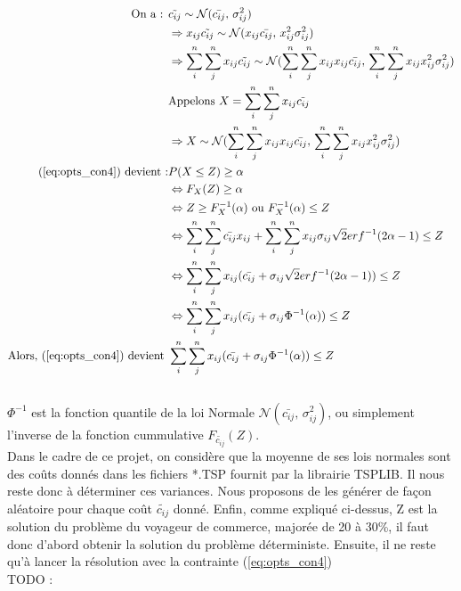 \documentclass{article}
\begin{document}
\begin{equation}
\begin{aligned}
\textrm{On a : } 
& \tilde{c_{ij}} \sim \mathcal{N}(\bar{c_{ij}},\,\sigma_{ij}^{2})\\
&\Rightarrow x_{ij}\tilde{c_{ij}} \sim \mathcal{N}(x_{ij}\bar{c_{ij}},\, x_{ij}^2\sigma_{ij}^{2})\\
&\Rightarrow \sum_{i}^n \sum_{j}^n x_{ij}\tilde{c_{ij}} \sim \mathcal{N}(\sum_{i}^n \sum_{j}^n x_{ij} x_{ij}\bar{c_{ij}},\, \sum_{i}^n \sum_{j}^n x_{ij} x_{ij}^2\sigma_{ij}^{2})\\
&\textrm{Appelons } X = \sum_{i}^n \sum_{j}^n x_{ij}\tilde{c_{ij}}\\ 
&\Rightarrow X \sim \mathcal{N}(\sum_{i}^n \sum_{j}^n x_{ij} x_{ij}\bar{c_{ij}},\, \sum_{i}^n \sum_{j}^n x_{ij} x_{ij}^2\sigma_{ij}^{2})\\
\textrm{(\ref{eq:opts_con4}) devient :} 
& P(X \leq Z) \geq \alpha \\
&\Leftrightarrow F_X(Z) \geq \alpha\\
&\Leftrightarrow Z \geq F_X^{-1}(\alpha) \textrm{ ou } F_X^{-1}(\alpha) \leq Z\\
&\Leftrightarrow \sum_i^n \sum_j^n \bar{c_{ij}} x_{ij} + \sum_i^n \sum_j^n x_{ij} \sigma_{ij} \sqrt{2}erf^{-1}(2\alpha - 1) \leq Z\\
&\Leftrightarrow \sum_i^n \sum_j^n x_{ij}  (\bar{c_{ij}}  + \sigma_{ij} \sqrt{2}erf^{-1}(2\alpha - 1)) \leq Z\\
&\Leftrightarrow \sum_i^n \sum_j^n x_{ij}  (\bar{c_{ij}}  + \sigma_{ij} \Phi^{-1}(\alpha)) \leq Z\\
\textrm{Alors, (\ref{eq:opts_con4}) devient } & \sum_i^n \sum_j^n x_{ij}  (\bar{c_{ij}}  + \sigma_{ij} \Phi^{-1}(\alpha)) \leq Z \label{eq:opts_con4q}\\
\end{aligned}
\end{equation}\\
\(\Phi^{-1}\) est la fonction quantile de la loi Normale \(\mathcal{N}(\bar{c_{ij}},\,\sigma_{ij}^{2})\), ou simplement l'inverse de la fonction cummulative \(F_{\tilde{c_{ij}}}(Z)\).\\
Dans le cadre de ce projet, on considère que la moyenne de ses lois normales sont des coûts donnés dans les fichiers *.TSP fournit par la librairie TSPLIB. Il nous reste donc à déterminer ces variances. Nous proposons de les générer de façon aléatoire pour chaque coût \(\tilde{c_{ij}}\) donné.
Enfin, comme expliqué ci-dessus, Z est la solution du problème du voyageur de commerce, majorée de 20 à 30\%, il faut donc d'abord obtenir la solution du problème déterministe. Ensuite, il ne reste qu'à lancer la résolution avec la contrainte (\ref{eq:opts_con4})\\
TODO : 
\end{document}
